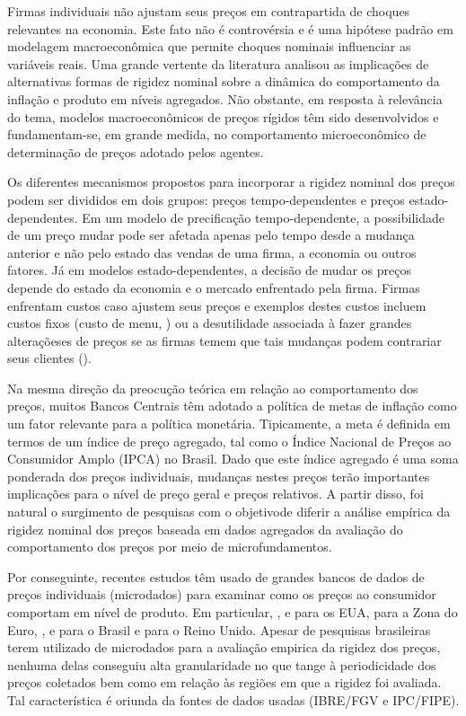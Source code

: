 \documentclass[twoside,a4paper,11pt]{report}
\begin{document}
Firmas individuais não ajustam seus preços em contrapartida de choques relevantes na economia. Este fato não é controvérsia e é uma hipótese padrão em modelagem macroeconômica que permite choques nominais influenciar as variáveis reais. Uma grande vertente da literatura analisou as implicações de alternativas formas de rigidez nominal sobre a dinâmica do comportamento da inflação e produto em níveis agregados. Não obstante, em resposta à relevância do tema, modelos macroeconômicos de preços rígidos têm sido desenvolvidos e fundamentam-se, em grande medida, no comportamento microeconômico de determinação de preços adotado pelos agentes. 

Os diferentes mecanismos propostos para incorporar a rigidez nominal dos preços podem ser divididos em dois grupos: preços tempo-dependentes e preços estado-dependentes. Em um modelo de precificação tempo-dependente, a possibilidade de um preço mudar pode ser afetada apenas pelo tempo desde a mudança anterior e não pelo estado das vendas de uma firma, a economia ou outros fatores. Já em modelos estado-dependentes, a decisão de mudar os preços depende do estado da economia e o mercado enfrentado pela firma. Firmas enfrentam custos caso ajustem seus preços e exemplos destes custos incluem custos fixos (custo de menu, \citet{mankiw1985small}) ou a desutilidade associada à fazer grandes alteraçõeses de preços se as firmas temem que tais mudanças podem contrariar seus clientes (\citet{rotemberg1982sticky}). 

Na mesma direção da preocução teórica em relação ao comportamento dos preços, muitos Bancos Centrais têm adotado a política de metas de inflação como um fator relevante para a política monetária. Tipicamente, a meta é definida em termos de um índice de preço agregado, tal como o Índice Nacional de Preços ao Consumidor Amplo (IPCA) no Brasil. Dado que este índice agregado é uma soma ponderada dos preços individuais, mudanças nestes preços terão importantes implicações para o nível de preço geral e preços relativos. A partir disso, foi natural o surgimento de pesquisas com o objetivode diferir a análise empírica da rigidez nominal dos preços baseada em dados agregados da avaliação do comportamento dos preços por meio de microfundamentos. 

Por conseguinte, recentes estudos têm usado de grandes bancos de dados de preços individuais (microdados) para examinar como os preços ao consumidor comportam em nível de produto. Em particular, \citet{bils2004some}, \citet{nakamura2008five} e \citet{klenow2008state} para os EUA, \citet{dhyne2006price} para a Zona do Euro, \citet{gouvea2007nominal}, \citet{matos2009comportamento} e \citet{lopes2008rigidez} para o Brasil e \citet{bunn2012examining} para o Reino Unido. Apesar de pesquisas brasileiras terem utilizado de microdados para a avaliação empirica da rigidez dos preços, nenhuma delas conseguiu alta granularidade no que tange à periodicidade dos preços coletados bem como em relação às regiões em que a rigidez foi avaliada. Tal característica é oriunda da fontes de dados usadas (IBRE/FGV e IPC/FIPE). 
\end{document}
